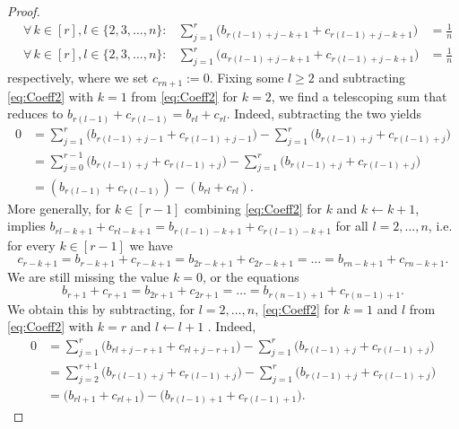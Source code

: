 \documentclass[10pt,a4paper]{article}
\numberwithin{equation}{section}
\begin{document}
\begin{proof}
\begin{align}
	&\forall \, k \in [r], l \in \{2,3,\ldots,n\} \colon &\sum_{j=1}^{r} \big( b_{r(l-1)+j - k + 1} + c_{r(l-1)+j - k + 1} \big) &= \frac{1}{n} \label{eq:Coeff2} \\
	&\forall \, k \in [r], l \in \{2,3,\ldots,n\} \colon &\sum_{j=1}^{r} \big( a_{r(l-1)+j - k + 1} + c_{r(l-1)+j - k + 1} \big) &= \frac{1}{n} \label{eq:Coeff3}
	\end{align}
respectively, where we set  $c_{r n + 1} := 0$. Fixing some $l \geq 2$ and subtracting \cref{eq:Coeff2} with $k = 1$ from \cref{eq:Coeff2} for $k= 2$, we find a telescoping sum that reduces to $b_{r(l-1)} + c_{r(l-1)} = b_{r l} + c_{r l}$. Indeed, subtracting the two yields
\begin{align*}
	0 &= \sum_{j=1}^{r} \big( b_{r(l-1)+j - 1} + c_{r(l-1)+j - 1} \big) - \sum_{j=1}^{r} \big( b_{r(l-1)+j} + c_{r(l-1)+j} \big) \\
	&= \sum_{j=0}^{r-1} \big( b_{r(l-1)+j } + c_{r(l-1)+j } \big)  - \sum_{j=1}^{r} \big( b_{r(l-1)+j} + c_{r(l-1)+j} \big) \\
	&= ( b_{r(l-1)} + c_{r(l-1)}) - (b_{r l} + c_{r l}).
	\end{align*}
More generally, for $k \in  [r-1]$ combining \eqref{eq:Coeff2} for $k$ and $k \leftarrow k + 1$, implies 
	$b_{r l - k + 1} + c_{r l - k + 1} = b_{r(l-1)- k + 1} + c_{r(l-1)- k + 1}$
for all $l = 2,\ldots,n$, i.e. for every $k \in [r - 1]$ we have
	\begin{equation}\label{eq:StackBandC1}
	c_{r - k + 1} = b_{r - k + 1} + c_{r - k+ 1} = b_{2r - k + 1} + c_{2r - k + 1} = \ldots = b_{r n - k + 1} + c_{r n - k + 1}.
	\end{equation}
We are still missing the value $k = 0$, or the equations 
\begin{equation}\label{eq:StackBandC2}
	b_{r+1} + c_{r+1} = b_{2r + 1} + c_{2r + 1} = \ldots = b_{r(n-1) + 1} + c_{r(n-1) + 1}.
	\end{equation}
We obtain this by subtracting, for $l = 2, \dots, n$,  \eqref{eq:Coeff2} for $k = 1$ and $l$ from \eqref{eq:Coeff2} with $k = r$ and $l \leftarrow l + 1$ . Indeed, 
\begin{align*}0 &= \sum_{j=1}^{r} \big( b_{r l+j - r + 1} + c_{r l +j - r + 1} \big) - \sum_{j=1}^{r} \big( b_{r(l-1)+j} + c_{r(l-1)+j} \big) \\
&= \sum_{j=2}^{r+1} \big( b_{r(l-1)+j } + c_{r(l-1) +j}\big) - \sum_{j=1}^{r} \big( b_{r(l-1)+j} + c_{r(l-1)+j} \big) \\
&= \big( b_{r l + 1} + c_{r l + 1}\big) - \big( b_{r(l-1)+1} + c_{r(l-1)+1} \big).
\end{align*}


\end{proof}
\end{document}
